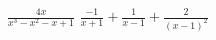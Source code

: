 {$\displaystyle \frac{4x}{x^3-x^2-x+1}$}
{$\displaystyle \frac{-1}{x+1} + \frac{1}{x-1} + \frac{2}{(x-1)^2}$}
